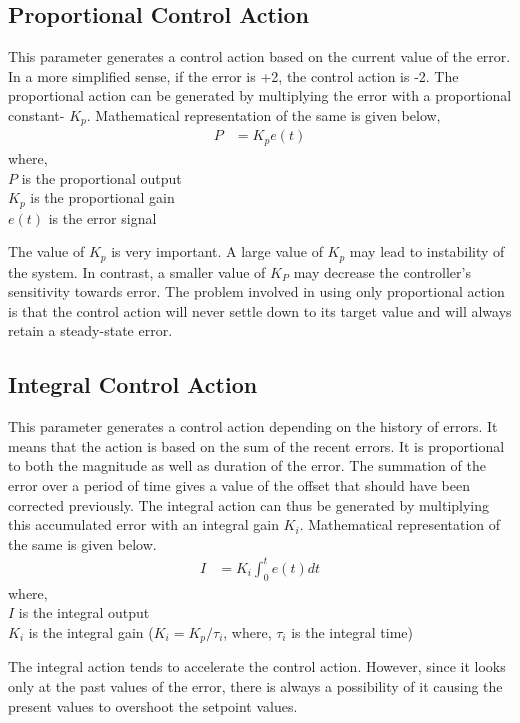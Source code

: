  \subsection{Proportional Control Action}
This parameter generates a control action based on the current value of the error. In a more simplified sense, 
if the error is +2, the control action is  -2. The proportional action can be generated by multiplying the error 
with a proportional constant- $K_p$. Mathematical representation of the same is given below,
\begin{align}
P &= K_p e(t)
\end{align}
where,\\
$P$ is the proportional output\\
$K_p$ is the proportional gain\\
$e(t)$ is the error signal

The value of  $K_p$ is very important. A large value of $K_p$ may lead to instability of the system. In contrast, 
a smaller value of $K_P$ may decrease the controller's sensitivity towards error. The problem involved in using only 
proportional action is that the control action will never settle down to its target value and will always retain 
a steady-state error.
\subsection{Integral Control Action}
This parameter generates a control action depending on the history of errors. It means that the action is based on 
the sum of the recent errors. It is proportional to both the magnitude as well as duration of the error. The summation
of the error over a period of time gives a value of the offset that should have been corrected previously. The integral 
action can thus be generated by multiplying this accumulated error with an integral gain $K_i$. Mathematical representation 
of the same is given below.
\begin{align}
I&=K_i\int_0^te(t)dt
\end{align}
where,\\
$I$ is the integral output\\
$K_i$ is the integral gain ($K_i=K_p / \tau _i$, where, $\tau _i$ is the integral time)

The integral action tends to accelerate the control action. However, since it looks only at the past values of the error, 
there is always a possibility of it causing the present values to overshoot the setpoint values.

